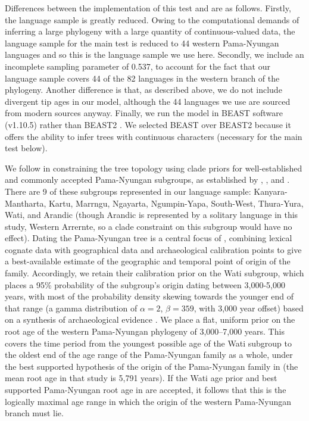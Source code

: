 Differences between the implementation of this test and \textcite{bouckaert_origin_2018} are as follows. Firstly, the language sample is greatly reduced. Owing to the computational demands of inferring a large phylogeny with a large quantity of continuous-valued data, the language sample for the main test is reduced to 44 western Pama-Nyungan languages and so this is the language sample we use here. Secondly, we include an incomplete sampling parameter of 0.537, to account for the fact that our language sample covers 44 of the 82 languages in the western branch of the \textcite{bouckaert_origin_2018} phylogeny. Another difference is that, as described above, we do not include divergent tip ages in our model, although the 44 languages we use are sourced from modern sources anyway. Finally, we run the model in BEAST software (v1.10.5) \autocite{suchard_bayesian_2018} rather than BEAST2 \autocite{bouckaert_beast_2019}. We selected BEAST over BEAST2 because it offers the ability to infer trees with continuous characters (necessary for the main test below).

We follow \textcite{bouckaert_origin_2018} in constraining the tree topology using clade priors for well-established and commonly accepted Pama-Nyungan subgroups, as established by \textcite{ogrady_languages_1966}, \textcite{muhlhausler_atlas_1996}, \textcite{koch_languages_2014} and \textcite{bowern_computational_2012}. There are 9 of these subgroups represented in our language sample: Kanyara-Mantharta, Kartu, Marrngu, Ngayarta, Ngumpin-Yapa, South-West, Thura-Yura, Wati, and Arandic (though Arandic is represented by a solitary language in this study, Western Arrernte, so a clade constraint on this subgroup would have no effect). Dating the Pama-Nyungan tree is a central focus of \textcite{bouckaert_origin_2018}, combining lexical cognate data with geographical data and archaeological calibration points to give a best-available estimate of the geographic and temporal point of origin of the family. Accordingly, we retain their calibration prior on the Wati subgroup, which places a 95\% probability of the subgroup's origin dating between 3,000-5,000 years, with most of the probability density skewing towards the younger end of that range (a gamma distribution of \(\alpha = 2\), \(\beta = 359\), with 3,000 year offset) based on a synthesis of archaeological evidence \autocite[see][p.~746]{bouckaert_origin_2018}. We place a flat, uniform prior on the root age of the western Pama-Nyungan phylogeny of 3,000--7,000 years. This covers the time period from the youngest possible age of the Wati subgroup to the oldest end of the age range of the Pama-Nyungan family as a whole, under the best supported hypothesis of the origin of the Pama-Nyungan family in \textcite{bouckaert_origin_2018} (the mean root age in that study is 5,791 years). If the Wati age prior and best supported Pama-Nyungan root age in \textcite{bouckaert_origin_2018} are accepted, it follows that this is the logically maximal age range in which the origin of the western Pama-Nyungan branch must lie.

